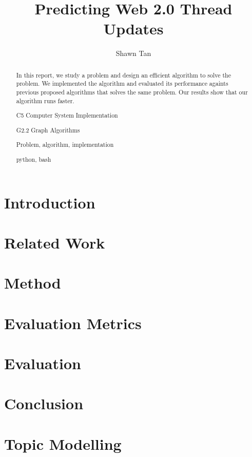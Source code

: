 \documentclass[hyp]{socreport}
\begin{document}

\title{Predicting Web 2.0 Thread Updates}
\author{Shawn Tan}
\maketitle
\begin{abstract}
In this report, we study a problem and design an efficient algorithm
to solve the problem.  We implemented the algorithm and evaluated
its performance againts previous proposed algorithms that solves the
same problem.  Our results show that our algorithm runs faster.

\begin{descriptors}
    \item C5 Computer System Implementation
	\item G2.2 Graph Algorithms
\end{descriptors}
\begin{keywords}
	Problem, algorithm, implementation
\end{keywords}
\begin{implement}
	python, bash
\end{implement}
\end{abstract}

\begin{acknowledgement}
\end{acknowledgement}

\listoffigures 
\listoftables
\tableofcontents 

\chapter{Introduction}
	
\chapter{Related Work}
	
\chapter{Method}
	
\chapter{Evaluation Metrics}
	
\chapter{Evaluation}
	
\chapter{Conclusion}
	




\appendix
\chapter{Topic Modelling}\label{top_modeling}

\end{document}
